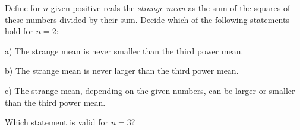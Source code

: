 Define for $n$ given positive reals the \textit{strange mean} as the sum of the squares of these numbers divided by their sum. Decide which of the following statements hold for $n=2$:

a) The strange mean is never smaller than the third power mean.

b) The strange mean is never larger than the third power mean.

c) The strange mean, depending on the given numbers, can be larger or smaller than the third power mean.

Which statement is valid for $n=3$?